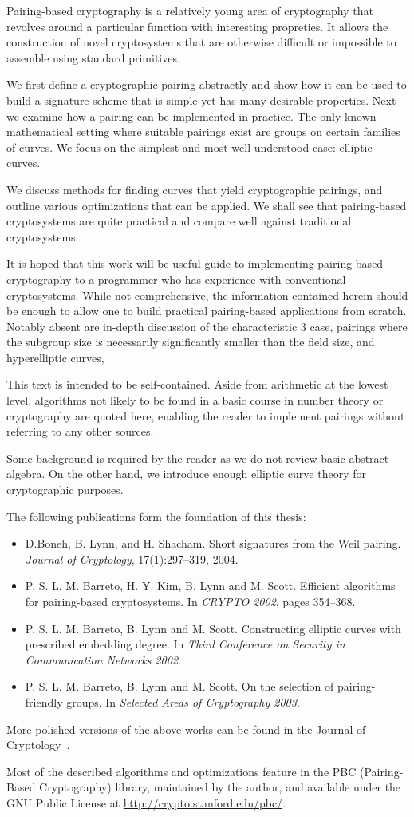 \beforepreface
{}
Pairing-based cryptography is a relatively young area of cryptography that
revolves around a particular function with interesting propreties.
It allows the construction of novel cryptosystems that are otherwise
difficult or impossible to assemble using standard primitives.

We first define a cryptographic pairing abstractly and show how it
can be used to build a signature scheme that is simple yet has many
desirable properties.
Next we examine how a pairing can be implemented in practice. The only known
mathematical setting where suitable pairings exist are groups on certain
families of curves. We focus on the simplest and most well-understood case:
elliptic curves.

We discuss methods for finding curves that yield cryptographic pairings,
and outline various optimizations that can be applied. We shall see that
pairing-based cryptosystems are quite practical and compare well against
traditional cryptosystems.

It is hoped that this work will be useful guide to implementing pairing-based
cryptography to a programmer who has experience with conventional
cryptosystems. While not comprehensive,
the information contained herein should be enough to allow one to build
practical pairing-based applications from scratch.
Notably absent are in-depth discussion of the characteristic 3 case,
pairings where the subgroup size is necessarily significantly
smaller than the field size, and hyperelliptic curves,

This text is intended to be self-contained. Aside from
arithmetic at the lowest level, algorithms not likely to
be found in a basic course in number theory or cryptography are quoted here,
enabling the reader to implement pairings without referring to any other
sources.

Some background is required by the reader as
we do not review basic abstract algebra.
On the other hand, we introduce enough elliptic curve theory for
cryptographic purposes.

The following publications
form the foundation of this thesis:
\begin{itemize}
\item D.Boneh, B. Lynn, and H. Shacham. Short signatures from the Weil pairing.
{\it Journal of Cryptology}, 17(1):297--319, 2004.
\item
P. S. L. M. Barreto, H. Y. Kim, B. Lynn and M. Scott.
Efficient algorithms for pairing-based cryptosystems. In {\it CRYPTO 2002},
pages 354--368.
\item P. S. L. M. Barreto, B. Lynn and M. Scott.
Constructing elliptic curves with prescribed embedding degree. In {\it Third
Conference on Security in Communication Networks 2002}.
\item P. S. L. M. Barreto, B. Lynn and M. Scott.
On the selection of pairing-friendly groups. In {\it Selected Areas of Cryptography 2003}.
\end{itemize}
More polished versions of the above works can be found
in the Journal of Cryptology~\cite{blsjournal, balsjournal}.

Most of the described algorithms and optimizations
feature in the PBC (Pairing-Based Cryptography) library, maintained by the
author, and available under the GNU Public License at 
\url{http://crypto.stanford.edu/pbc/}.

